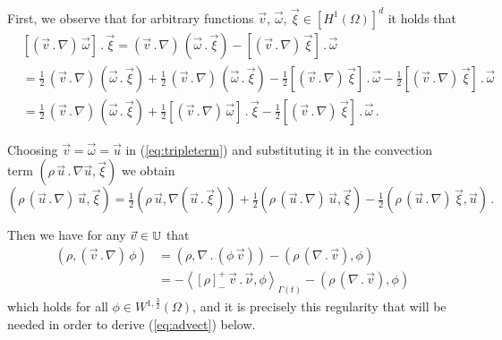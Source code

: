 First, we observe that for arbitrary functions $\vec v$,
$\vec \omega$, $\vec \xi \in [H^1(\Omega)]^d$ it holds that
\begin{align}\label{eq:tripleterm}
& [(\vec v\,.\,\nabla)\,\vec \omega]\,.\,\vec \xi
 = (\vec v\,.\,\nabla)\,(\vec \omega\,.\,\vec \xi) -
[(\vec v\,.\,\nabla)\,\vec \xi]\,.\,\vec \omega \nonumber \\
& = \tfrac{1}{2}\,(\vec v\,.\,\nabla)\,
(\vec \omega\,.\,\vec \xi) + \tfrac{1}{2}\,(\vec v\,.\,\nabla)\,
(\vec \omega\,.\,\vec \xi) -\tfrac{1}{2}[(\vec v\,.\,\nabla)\,\vec
\xi] \,.\,\vec \omega -\tfrac{1}{2}[(\vec v\,.\,\nabla)\,\vec
\xi] \,.\,\vec \omega \nonumber \\
& = \tfrac{1}{2}\,(\vec v\,.\,\nabla)\, (\vec \omega\,.\,\vec \xi) +
\tfrac{1}{2}[(\vec v\,.\,\nabla)\,\vec \omega]\,.\,\vec \xi -
\tfrac{1}{2}[(\vec v\,.\,\nabla)\,\vec \xi] \,.\,\vec \omega\,.
\end{align}

Choosing $\vec v = \vec \omega = \vec u$ in (\ref{eq:tripleterm}) and
substituting it in the convection term $\left(\rho\,\vec u \,.\, \nabla \vec
u,\vec \xi\right)$ we obtain
\begin{equation}\label{eq:ns_advect_tripleterm}
( \rho\,(\vec u \,.\,\nabla)\,\vec u, \vec \xi) =
\tfrac{1}{2}(\rho\,\vec u , \nabla(\vec u\,.\,\vec \xi))
+ \tfrac{1}{2}(\rho\,(\vec u \,.\,\nabla)\,\vec u, \vec \xi)
-\tfrac{1}{2}(\rho\,(\vec u\,.\,\nabla)\,\vec \xi,\vec u)\,.
\end{equation}

Then we have for any $\vec v \in \mathbb{U}$ that
\begin{align}\label{eq:ibp0}
( \rho,(\vec v \,.\,\nabla)\,\phi) & = (\rho, \nabla\,.\,(\phi\,\vec v))
- (\rho\,(\nabla\,.\,\vec v), \phi) \nonumber \\ & =
- \left\langle [\rho]_-^+\,\vec v\,.\,\vec \nu,
  \phi \right\rangle_{\Gamma(t)}
- (\rho\,(\nabla\,.\,\vec v), \phi)
\end{align}
which holds for all $\phi\in W^{1,\frac{3}{2}}(\Omega)$, and it is
precisely this regularity that will be needed in order to derive
(\ref{eq:advect}) below.

